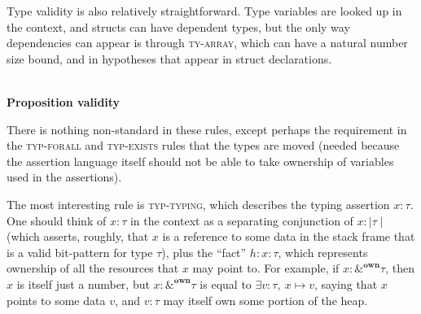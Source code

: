\documentclass[acmsmall,nonacm]{acmart}
\newcommand*{\N}{\mathbb{N}}
\newcommand{\wand}{\mathrel{-\!\!\ast}}
\newcommand{\core}[1]{{\mid}#1{\mid}}
\newcommand{\proves}{\vdash}
\newcommand{\judgment}[2][]{\noindent\\\textbf{#1}\hspace{\stretch{1}}\fbox{$#2$}\nopagebreak}
\newcommand*{\axiom}[2][]{\infer[#1]{}{#2}}
\begin{document}
Type validity is also relatively straightforward. Type variables are looked up in the context, and structs can have dependent types, but the only way dependencies can appear is through \textsc{ty-array}, which can have a natural number size bound, and in hypotheses that appear in struct declarations.

\judgment[Proposition validity]{\Gamma \proves A\;\mathsf{prop}}

There is nothing non-standard in these rules, except perhaps the requirement in the \textsc{typ-forall} and \textsc{typ-exists} rules that the types are moved (needed because the assertion language itself should not be able to take ownership of variables used in the assertions).

The most interesting rule is \textsc{typ-typing}, which describes the typing assertion $\boxed{x:\tau}$. One should think of $x:\tau$ in the context as a separating conjunction of $x:\core\tau$ (which asserts, roughly, that $x$ is a reference to some data in the stack frame that is a valid bit-pattern for type $\tau$), plus the ``fact'' $h:\boxed{x:\tau}$, which represents ownership of all the resources that $x$ may point to. For example, if $x:\&^\mathbf{own}\tau$, then $x$ is itself just a number, but $\boxed{x:\&^\mathbf{own}\tau}$ is equal to $\exists v:\tau,\ x\mapsto v$, saying that $x$ points to some data $v$, and $v:\tau$ may itself own some portion of the heap.
\end{document}
